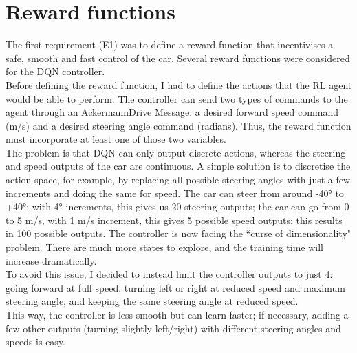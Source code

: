 \section{Reward functions}
The first requirement (E1) was to define a reward function that incentivises a safe, smooth and fast control of the car. Several reward functions were considered for the DQN controller. \\
Before defining the reward function, I had to define the actions that the RL agent would be able to perform. The controller can send two types of commands to the agent through an AckermannDrive Message: a desired forward speed command (m/s) and a desired steering angle command (radians). Thus, the reward function must incorporate at least one of those two variables. \\
The problem is that DQN can only output discrete actions, whereas the steering and speed outputs of the car are continuous. A simple solution is to discretise the action space, for example, by replacing all possible steering angles with just a few increments and doing the same for speed. The car can steer from around -40° to +40°: with 4° increments, this gives us 20 steering outputs; the car can go from 0 to 5 m/s, with 1 m/s increment, this gives 5 possible speed outputs: this results in 100 possible outputs. The controller is now facing the ``curse of dimensionality" problem. There are much more states to explore, and the training time will increase dramatically. \\
To avoid this issue, I decided to instead limit the controller outputs to just 4: going forward at full speed, turning left or right at reduced speed and maximum steering angle, and keeping the same steering angle at reduced speed. \\
This way, the controller is less smooth but can learn faster; if necessary, adding a few other outputs (turning slightly left/right) with different steering angles and speeds is easy. \\

